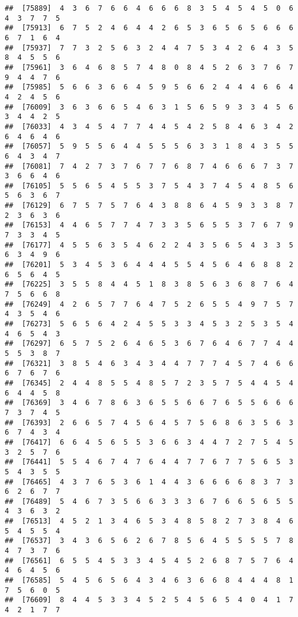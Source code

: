 \documentclass[
]{book}
\begin{document}
\begin{verbatim}
##  [75889]  4  3  6  7  6  6  4  6  6  6  8  3  5  4  5  4  5  0  6  4  3  7  7  5
##  [75913]  6  7  5  2  4  6  4  4  2  6  5  3  6  5  6  5  6  6  6  6  7  1  6  4
##  [75937]  7  7  3  2  5  6  3  2  4  4  7  5  3  4  2  6  4  3  5  8  4  5  5  6
##  [75961]  3  6  4  6  8  5  7  4  8  0  8  4  5  2  6  3  7  6  7  9  4  4  7  6
##  [75985]  5  6  6  3  6  6  4  5  9  5  6  6  2  4  4  4  6  6  4  4  2  4  5  6
##  [76009]  3  6  3  6  6  5  4  6  3  1  5  6  5  9  3  3  4  5  6  3  4  4  2  5
##  [76033]  4  3  4  5  4  7  7  4  4  5  4  2  5  8  4  6  3  4  2  6  4  6  4  6
##  [76057]  5  9  5  5  6  4  4  5  5  5  6  3  3  1  8  4  3  5  5  6  4  3  4  7
##  [76081]  7  4  2  7  3  7  6  7  7  6  8  7  4  6  6  6  7  3  7  3  6  6  4  6
##  [76105]  5  5  6  5  4  5  5  3  7  5  4  3  7  4  5  4  8  5  6  5  6  3  6  7
##  [76129]  6  7  5  7  5  7  6  4  3  8  8  6  4  5  9  3  3  8  7  2  3  6  3  6
##  [76153]  4  4  6  5  7  7  4  7  3  3  5  6  5  5  3  7  6  7  9  7  3  3  4  5
##  [76177]  4  5  5  6  3  5  4  6  2  2  4  3  5  6  5  4  3  3  5  6  3  4  9  6
##  [76201]  5  3  4  5  3  6  4  4  4  5  5  4  5  6  4  6  8  8  2  6  5  6  4  5
##  [76225]  3  5  5  8  4  4  5  1  8  3  8  5  6  3  6  8  7  6  4  7  5  6  6  8
##  [76249]  4  2  6  5  7  7  6  4  7  5  2  6  5  5  4  9  7  5  7  4  3  5  4  6
##  [76273]  5  6  5  6  4  2  4  5  5  3  3  4  5  3  2  5  3  5  4  4  6  5  4  3
##  [76297]  6  5  7  5  2  6  4  6  5  3  6  7  6  4  6  7  7  4  4  5  5  3  8  7
##  [76321]  3  8  5  4  6  3  4  3  4  4  7  7  7  4  5  7  4  6  6  6  7  6  7  6
##  [76345]  2  4  4  8  5  5  4  8  5  7  2  3  5  7  5  4  4  5  4  6  4  4  5  8
##  [76369]  3  4  6  7  8  6  3  6  5  5  6  6  7  6  5  5  6  6  6  7  3  7  4  5
##  [76393]  2  6  6  5  7  4  5  6  4  5  7  5  6  8  6  3  5  6  3  6  7  4  3  4
##  [76417]  6  6  4  5  6  5  5  3  6  6  3  4  4  7  2  7  5  4  5  3  2  5  7  6
##  [76441]  5  5  4  6  7  4  7  6  4  4  7  7  6  7  7  5  6  5  3  5  4  3  5  5
##  [76465]  4  3  7  6  5  3  6  1  4  4  3  6  6  6  6  8  3  7  3  6  2  6  7  7
##  [76489]  5  4  6  7  3  5  6  6  3  3  3  6  7  6  6  5  6  5  5  4  3  6  3  2
##  [76513]  4  5  2  1  3  4  6  5  3  4  8  5  8  2  7  3  8  4  6  5  4  5  5  4
##  [76537]  3  4  3  6  5  6  2  6  7  8  5  6  4  5  5  5  5  7  8  4  7  3  7  6
##  [76561]  6  5  5  4  5  3  3  4  5  4  5  2  6  8  7  5  7  6  4  4  6  4  5  6
##  [76585]  5  4  5  6  5  6  4  3  4  6  3  6  6  8  4  4  4  8  1  7  5  6  0  5
##  [76609]  8  4  4  5  3  3  4  5  2  5  4  5  6  5  4  0  4  1  7  4  2  1  7  7

\end{verbatim}
\end{document}
